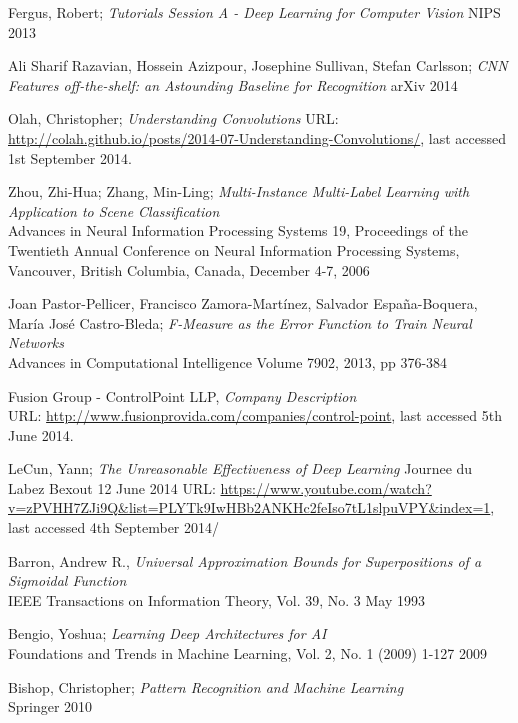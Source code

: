 \documentclass[a4paper,11pt]{article}
\begin{document}
\begin{thebibliography}{1}
 Fergus, Robert;
 \emph{Tutorials Session A - Deep Learning for Computer Vision}
 NIPS 2013  
  
 Ali Sharif Razavian, Hossein Azizpour, Josephine Sullivan, Stefan Carlsson;
 \emph{CNN Features off-the-shelf: an Astounding Baseline for Recognition}
 arXiv 2014
 
 Olah, Christopher;
 \emph{Understanding Convolutions}
 URL: \url{http://colah.github.io/posts/2014-07-Understanding-Convolutions/}, last accessed 1st September 2014.

 Zhou, Zhi-Hua; Zhang, Min-Ling;
  \emph{Multi-Instance Multi-Label Learning with Application to Scene Classification}\\
  Advances in Neural Information Processing Systems 19, 
  Proceedings of the Twentieth Annual Conference on Neural Information Processing Systems, 
  Vancouver, British Columbia, Canada, 
  December 4-7, 2006

 Joan Pastor-Pellicer, Francisco Zamora-Martínez, Salvador España-Boquera, María José Castro-Bleda;
 \emph{F-Measure as the Error Function to Train Neural Networks}\\
 Advances in Computational Intelligence
 Volume 7902, 2013, pp 376-384

 Fusion Group - ControlPoint LLP,
 \emph{Company Description}\\
 URL: \url{http://www.fusionprovida.com/companies/control-point}, last accessed 5th June 2014. 
  
 LeCun, Yann;
 \emph{The Unreasonable Effectiveness of Deep Learning}
 Journee du Labez Bexout
 12 June 2014  
 URL: \url{https://www.youtube.com/watch?v=zPVHH7ZJi9Q&list=PLYTk9IwHBb2ANKHc2feIso7tL1slpuVPY&index=1}, last accessed 4th September 2014/
  
 Barron, Andrew R.,
 \emph{Universal Approximation Bounds for Superpositions of a Sigmoidal Function}\\
 IEEE Transactions on Information Theory, 
 Vol. 39, No. 3
 May 1993

 Bengio, Yoshua;
 \emph{Learning Deep Architectures for AI}\\
 Foundations and Trends in Machine Learning, 
 Vol. 2, No. 1 (2009) 1-127
 2009

 Bishop, Christopher;
 \emph{Pattern Recognition and Machine Learning}\\
 Springer 2010


\end{thebibliography}
\end{document}
